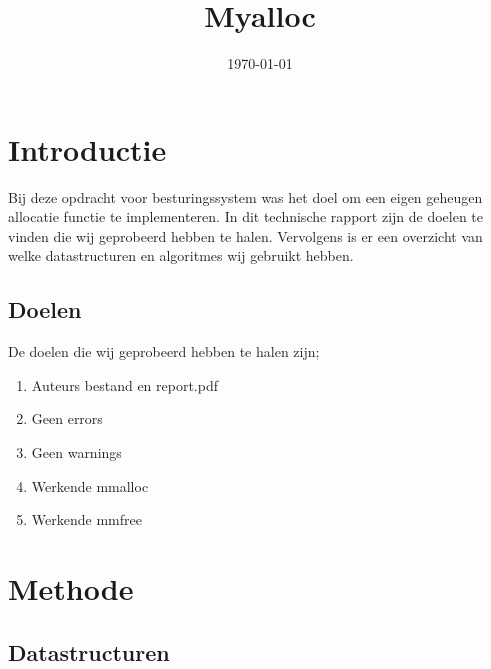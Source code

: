 \documentclass{uva-inf-article}
\title{Myalloc}
\date{\today}
\begin{document}
\maketitle




\section{Introductie}
Bij deze opdracht voor besturingssystem was het doel om een eigen geheugen allocatie
functie te implementeren. In dit technische rapport zijn de doelen te vinden die
wij geprobeerd hebben te halen. Vervolgens is er een overzicht van welke datastructuren
en algoritmes wij gebruikt hebben.
\subsection{Doelen}
De doelen die wij geprobeerd hebben te halen zijn;
\begin{enumerate}
\item Auteurs bestand en report.pdf
\item Geen errors
\item Geen warnings
\item Werkende mmalloc
\item Werkende mmfree
\end{enumerate}


\section{Methode}
\subsection{Datastructuren}
\end{document}
